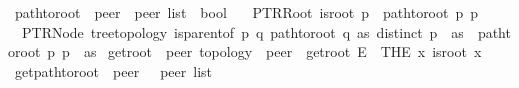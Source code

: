\begin{isabellebody}
\isadelimdocument
%
\endisadelimdocument
%
\isatagdocument
%
\isamarkuptrue%
%
\endisatagdocument
{\isafolddocument}%
%
\isadelimdocument
%
\endisadelimdocument
{}\isamarkupfalse%
\ path{\isacharunderscore}{\kern0pt}to{\isacharunderscore}{\kern0pt}root\ {\isacharcolon}{\kern0pt}{\isacharcolon}{\kern0pt}\ {\isachardoublequoteopen}{\isacharprime}{\kern0pt}peer\ {\isasymRightarrow}\ {\isacharprime}{\kern0pt}peer\ list\ {\isasymRightarrow}\ bool{\isachardoublequoteclose}\ \isanewline
\ \ PTRRoot{\isacharcolon}{\kern0pt}\ {\isachardoublequoteopen}{\isasymlbrakk}is{\isacharunderscore}{\kern0pt}root\ p{\isasymrbrakk}\ {\isasymLongrightarrow}\ path{\isacharunderscore}{\kern0pt}to{\isacharunderscore}{\kern0pt}root\ p\ {\isacharbrackleft}{\kern0pt}p{\isacharbrackright}{\kern0pt}{\isachardoublequoteclose}\ {\isacharbar}{\kern0pt}\isanewline
\ \ PTRNode{\isacharcolon}{\kern0pt}\ {\isachardoublequoteopen}{\isasymlbrakk}tree{\isacharunderscore}{\kern0pt}topology{\isacharsemicolon}{\kern0pt}\ is{\isacharunderscore}{\kern0pt}parent{\isacharunderscore}{\kern0pt}of\ p\ q{\isacharsemicolon}{\kern0pt}\ path{\isacharunderscore}{\kern0pt}to{\isacharunderscore}{\kern0pt}root\ q\ as{\isacharsemicolon}{\kern0pt}\ distinct\ {\isacharparenleft}{\kern0pt}p\ {\isacharhash}{\kern0pt}\ as{\isacharparenright}{\kern0pt}{\isasymrbrakk}\ {\isasymLongrightarrow}\ path{\isacharunderscore}{\kern0pt}to{\isacharunderscore}{\kern0pt}root\ p\ {\isacharparenleft}{\kern0pt}p\ {\isacharhash}{\kern0pt}\ as{\isacharparenright}{\kern0pt}{\isachardoublequoteclose}\isanewline
\isanewline
{}\isamarkupfalse%
\ get{\isacharunderscore}{\kern0pt}root\ {\isacharcolon}{\kern0pt}{\isacharcolon}{\kern0pt}\ {\isachardoublequoteopen}{\isacharprime}{\kern0pt}peer\ topology\ {\isasymRightarrow}\ {\isacharprime}{\kern0pt}peer{\isachardoublequoteclose}\ \ {\isachardoublequoteopen}get{\isacharunderscore}{\kern0pt}root\ E\ {\isacharequal}{\kern0pt}\ {\isacharparenleft}{\kern0pt}THE\ x{\isachardot}{\kern0pt}\ is{\isacharunderscore}{\kern0pt}root\ x{\isacharparenright}{\kern0pt}{\isachardoublequoteclose}\isanewline
\isanewline
{}\isamarkupfalse%
\ get{\isacharunderscore}{\kern0pt}path{\isacharunderscore}{\kern0pt}to{\isacharunderscore}{\kern0pt}root\ {\isacharcolon}{\kern0pt}{\isacharcolon}{\kern0pt}\ {\isachardoublequoteopen}{\isacharprime}{\kern0pt}peer\ {\isasymRightarrow}\ \ {\isacharprime}{\kern0pt}peer\ list{\isachardoublequoteclose}\ \isanewline

\end{isabellebody}
